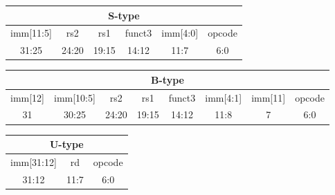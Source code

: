 \documentclass{jlreq}
\begin{document}
\begin{center}
    \begin{tabular}{|*{32}{c|}}
        \hline
        \multicolumn{32}{|c|}{S-type} \\
        \hline
        \multicolumn{7}{|c|}{imm[11:5]} & \multicolumn{5}{c|}{rs2} & \multicolumn{5}{c|}{rs1} & \multicolumn{3}{c|}{funct3} & \multicolumn{5}{c|}{imm[4:0]} & \multicolumn{7}{c|}{opcode} \\
        \hline
        \multicolumn{7}{|c|}{31:25} & \multicolumn{5}{c|}{24:20} & \multicolumn{5}{c|}{19:15} & \multicolumn{3}{c|}{14:12} & \multicolumn{5}{c|}{11:7} & \multicolumn{7}{c|}{6:0} \\
        \hline
    \end{tabular}
\end{center}
\vspace{0.5cm}

\begin{center}
    \begin{tabular}{|*{32}{c|}}
        \hline
        \multicolumn{32}{|c|}{B-type} \\
        \hline
        \multicolumn{1}{|c|}{imm[12]} & \multicolumn{6}{c|}{imm[10:5]} & \multicolumn{5}{c|}{rs2} & \multicolumn{5}{c|}{rs1} & \multicolumn{3}{c|}{funct3} & \multicolumn{4}{c|}{imm[4:1]} & \multicolumn{1}{c|}{imm[11]} & \multicolumn{7}{c|}{opcode} \\
        \hline
        \multicolumn{1}{|c|}{31} & \multicolumn{6}{c|}{30:25} & \multicolumn{5}{c|}{24:20} & \multicolumn{5}{c|}{19:15} & \multicolumn{3}{c|}{14:12} & \multicolumn{4}{c|}{11:8} & \multicolumn{1}{c|}{7} & \multicolumn{7}{c|}{6:0} \\
        \hline
    \end{tabular}
\end{center}

\vspace{0.5cm}

\begin{center}
    \begin{tabular}{|*{32}{c|}}
        \hline
        \multicolumn{32}{|c|}{U-type} \\
        \hline
        \multicolumn{20}{|c|}{imm[31:12]} & \multicolumn{5}{c|}{rd} & \multicolumn{7}{c|}{opcode} \\
        \hline
        \multicolumn{20}{|c|}{31:12} & \multicolumn{5}{c|}{11:7} & \multicolumn{7}{c|}{6:0} \\
        \hline
    \end{tabular}
\end{center}
\end{document}
